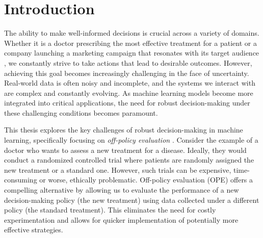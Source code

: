 

\chapter{\label{ch:1-intro}Introduction} 

\minitoc

The ability to make well-informed decisions is crucial across a variety of domains. 
Whether it is a doctor prescribing the most effective treatment for a patient or a company launching a marketing campaign that resonates with its target audience \citep{xu2020contextual,li2010contextual,bastani2019online}, we constantly strive to take actions that lead to desirable outcomes. 
However, achieving this goal becomes increasingly challenging in the face of uncertainty. Real-world data is often noisy and incomplete, and the systems we interact with are complex and constantly evolving. As machine learning models become more integrated into critical applications, the need for robust decision-making under these challenging conditions becomes paramount.


This thesis explores the key challenges of robust decision-making in machine learning, specifically focusing on \emph{off-policy evaluation} \citep{uncertainty5, adaptive-ope, uncertainty2, uncertainty3, uncertainty4, doubly-robust}. Consider the example of a doctor who wants to assess a new treatment for a disease. Ideally, they would conduct a randomized controlled trial \citep{tsiatis2019dynamic} where patients are randomly assigned the new treatment or a standard one. However, such trials can be expensive, time-consuming or worse, ethically problematic. Off-policy evaluation (OPE) offers a compelling alternative by allowing us to evaluate the performance of a new decision-making policy (the new treatment) using data collected under a different policy (the standard treatment). This eliminates the need for costly experimentation and allows for quicker implementation of potentially more effective strategies.

